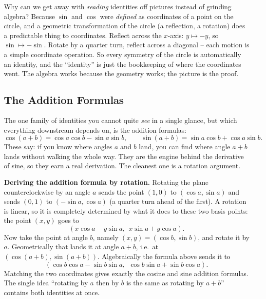 \begin{whybox}
Why can we get away with \emph{reading} identities off pictures instead of grinding algebra? Because $\sin$ and $\cos$ were \emph{defined} as coordinates of a point on the circle, and a geometric transformation of the circle (a reflection, a rotation) does a predictable thing to coordinates. Reflect across the $x$-axis: $y \mapsto -y$, so $\sin \mapsto -\sin$. Rotate by a quarter turn, reflect across a diagonal -- each motion is a simple coordinate operation. So every symmetry of the circle is automatically an identity, and the ``identity'' is just the bookkeeping of where the coordinates went. The algebra works because the geometry works; the picture is the proof.
\end{whybox}

\subsection{The Addition Formulas}

The one family of identities you cannot quite \emph{see} in a single glance, but which everything downstream depends on, is the addition formulas:
\[
  \cos(a+b) = \cos a\cos b - \sin a \sin b,
  \qquad
  \sin(a+b) = \sin a\cos b + \cos a\sin b.
\]
These say: if you know where angles $a$ and $b$ land, you can find where angle $a+b$ lands without walking the whole way. They are the engine behind the derivative of sine, so they earn a real derivation. The cleanest one is a rotation argument.

\begin{focusbox}
\textbf{Deriving the addition formula by rotation.} Rotating the plane counterclockwise by an angle $a$ sends the point $(1,0)$ to $(\cos a, \sin a)$ and sends $(0,1)$ to $(-\sin a, \cos a)$ (a quarter turn ahead of the first). A rotation is linear, so it is completely determined by what it does to these two basis points: the point $(x,y)$ goes to
\[
  (x\cos a - y\sin a,\ \ x\sin a + y\cos a).
\]
Now take the point at angle $b$, namely $(x,y) = (\cos b, \sin b)$, and rotate it by $a$. Geometrically that lands it at angle $a+b$, i.e.\ at $(\cos(a+b), \sin(a+b))$. Algebraically the formula above sends it to
\[
  (\cos b\cos a - \sin b\sin a,\ \ \cos b \sin a + \sin b\cos a).
\]
Matching the two coordinates gives exactly the cosine and sine addition formulas. The single idea ``rotating by $a$ then by $b$ is the same as rotating by $a+b$'' contains both identities at once.
\end{focusbox}

